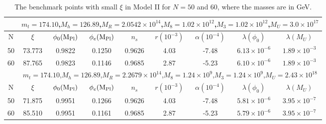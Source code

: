\documentclass[aps,prd,preprint,superscriptaddress,showpacs,ctexart]{revtex4-1}
\providecommand{\tabularnewline}{\\}
\begin{document}
\begin{table}[H]
\begin{tabular}{|c|c|c|c|c|c|c|c|c|}
\hline
\hline
 & \multicolumn{8}{c|}{{\footnotesize{}{}{}$m_{t}=174.10$,$M_{h}=126.89$,$M_{R}=2.0542\times10^{14}$,$M_{8}=1.02\times10^{12}$,$M_{3}=1.02\times10^{12}$,$M_{U}=3.0\times10^{17}$}}\tabularnewline
\hline
{\footnotesize{}{}{}N}  & {\footnotesize{}{}{}$\xi$ }  & {\footnotesize{}{}{}$\phi_{0}({\rm M_{Pl})}$}  & {\footnotesize{}{}{}$\phi_{e}({\rm M_{Pl})}$}  & {\footnotesize{}{}{}$n_{s}$}  & {\footnotesize{}{}{}$r(10^{-3})$}  & {\footnotesize{}{}{}$\alpha(10^{-4})$}  & {\footnotesize{}{}{}$\lambda(\phi_{0})$}  & {\footnotesize{}{}{}$\lambda(M_{U})$}\tabularnewline
\hline
{\footnotesize{}{}{}50}  & {\footnotesize{}{}{}73.773}  & {\footnotesize{}{}{}0.9822}  & {\footnotesize{}{}{}0.1250}  & {\footnotesize{}{}{}0.9626}  & {\footnotesize{}{}{}4.03}  & {\footnotesize{}{}{}-7.48}  & {\footnotesize{}{}{}$6.13\times10^{-6}$}  & {\footnotesize{}{}{}$1.89\times10^{-3}$}\tabularnewline
\hline
{\footnotesize{}{}{}60}  & {\footnotesize{}{}{}87.765}  & {\footnotesize{}{}{}0.9823}  & {\footnotesize{}{}{}0.1146}  & {\footnotesize{}{}{}0.9685}  & {\footnotesize{}{}{}2.87}  & {\footnotesize{}{}{}-5.23}  & {\footnotesize{}{}{}$6.10\times10^{-6}$}  & {\footnotesize{}{}{}$1.89\times10^{-3}$ }\tabularnewline
\hline
 & \multicolumn{8}{c|}{{\footnotesize{}{}{}$m_{t}=174.10$,$M_{h}=126.89$,$M_{R}=2.2679\times10^{14}$,$M_{8}=1.24\times10^{9}$,$M_{3}=1.24\times10^{9}$,$M_{U}=2.43\times10^{18}$}}\tabularnewline
\hline
{\footnotesize{}{}{}N}  & {\footnotesize{}{}{}$\xi$ }  & {\footnotesize{}{}{}$\phi_{0}({\rm M_{Pl})}$}  & {\footnotesize{}{}{}$\phi_{e}({\rm M_{Pl})}$}  & {\footnotesize{}{}{}$n_{s}$}  & {\footnotesize{}{}{}$r(10^{-3})$}  & {\footnotesize{}{}{}$\alpha(10^{-4})$}  & {\footnotesize{}{}{}$\lambda(\phi_{0})$}  & {\footnotesize{}{}{}$\lambda(M_{U})$}\tabularnewline
\hline
{\footnotesize{}{}{}50}  & {\footnotesize{}{}{}71.875}  & {\footnotesize{}{}{}0.9951}  & {\footnotesize{}{}{}0.1266}  & {\footnotesize{}{}{}0.9626}  & {\footnotesize{}{}{}4.03}  & {\footnotesize{}{}{}-7.48}  & {\footnotesize{}{}{}$5.81\times10^{-6}$}  & {\footnotesize{}{}{}$3.95\times10^{-7}$}\tabularnewline
\hline
{\footnotesize{}{}{}60}  & {\footnotesize{}{}{}85.510}  & {\footnotesize{}{}{}0.9951}  & {\footnotesize{}{}{}0.1161}  & {\footnotesize{}{}{}0.9685}  & {\footnotesize{}{}{}2.87}  & {\footnotesize{}{}{}-5.23}  & {\footnotesize{}{}{}$5.79\times10^{-6}$}  & {\footnotesize{}{}{}$3.95\times10^{-7}$ }\tabularnewline
\hline
\end{tabular}
\caption{The benchmark points with small $\xi$ in Model II for $N=50$ and
60, where the masses are  in GeV.\label{tab:small_xi_case2} }
\end{table}
\end{document}
